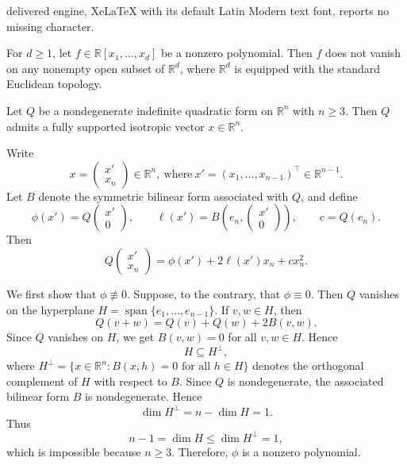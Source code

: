 \documentclass[10pt,a4paper]{amsart}
\newenvironment{pf}{\proof}{\endproof}
\begin{document}
delivered engine, XeLaTeX with its default Latin Modern text font, reports no missing character.
\begin{lem}\label{avoidance}
For $d\ge 1$, let $f\in \mathbb{R}[x_1,\dots,x_d]$ be a nonzero polynomial. Then $f$ does not vanish on any nonempty open subset of $\mathbb{R}^d$, where $\mathbb{R}^d$ is equipped with the standard Euclidean topology.
\end{lem}

\begin{prop}\label{prop: nonzero isotropic vector}
Let $Q$ be a nondegenerate indefinite quadratic form on $\mathbb{R}^n$ with
$n\ge3$. Then $Q$ admits a fully supported isotropic vector $x \in \mathbb{R}^n$.
\end{prop}

\begin{pf}
Write $$x=\begin{pmatrix}x'\\x_n\end{pmatrix}\in\mathbb{R}^n,\  \text{where}
\
x'=(x_1,\dots,x_{n-1})^\top\in\mathbb{R}^{n-1}.
$$
Let $B$ denote the symmetric bilinear form associated with $Q$, and define
\[
\phi(x')=Q\begin{pmatrix}x'\\0\end{pmatrix},\qquad
\ell(x')=B\left(e_n,\begin{pmatrix}x'\\0\end{pmatrix}\right),\qquad
c=Q(e_n).
\]
Then
\begin{equation}\label{eq:Q-decomposition}
Q\begin{pmatrix}x'\\x_n\end{pmatrix}
=
\phi(x')+2\ell(x')x_n+cx_n^2.
\end{equation}

We first show that $\phi\not\equiv 0$. Suppose, to the contrary, that
$\phi\equiv 0$. Then $Q$ vanishes on the hyperplane
\(
H=\operatorname{span}\{e_1,\dots,e_{n-1}\}.
\)
If $v,w\in H$, then
\[
Q(v+w)=Q(v)+Q(w)+2B(v,w).
\]
Since $Q$ vanishes on $H$, we get $B(v,w)=0$ for all $v,w\in H$. Hence
\[
H\subseteq H^\perp,
\]
where
\(
H^\perp=\{x\in\mathbb{R}^n:B(x,h)=0\text{ for all }h\in H\}
\)
denotes the orthogonal complement of $H$ with respect to $B$.
Since $Q$ is nondegenerate, the associated bilinear form $B$ is nondegenerate. Hence
\[
\dim H^\perp=n-\dim H=1.
\]
Thus
\[
n-1=\dim H\le \dim H^\perp=1,
\]
which is impossible because $n\ge 3$. Therefore, $\phi$ is a nonzero polynomial.


\end{pf}
\end{document}
